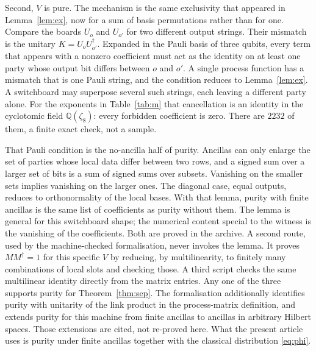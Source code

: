 \documentclass[11pt]{article}
\theoremstyle{definition}
\theoremstyle{remark}
\begin{document}
Second, \(V\) is pure. The mechanism is the same exclusivity that appeared in Lemma~\ref{lem:ex}, now for a sum of basis permutations rather than for one. Compare the boards \(U_o\) and \(U_{o'}\) for two different output strings. Their mismatch is the unitary \(K=U_o U_{o'}^{\dagger}\). Expanded in the Pauli basis of three qubits, every term that appears with a nonzero coefficient must act as the identity on at least one party whose output bit differs between \(o\) and \(o'\). A single process function has a mismatch that is one Pauli string, and the condition reduces to Lemma~\ref{lem:ex}. A switchboard may superpose several such strings, each leaving a different party alone. For the exponents in Table~\ref{tab:m} that cancellation is an identity in the cyclotomic field \(\mathbb{Q}(\zeta_8)\): every forbidden coefficient is zero. There are \(2232\) of them, a finite exact check, not a sample.

That Pauli condition is the no-ancilla half of purity. Ancillas can only enlarge the set of parties whose local data differ between two rows, and a signed sum over a larger set of bits is a sum of signed sums over subsets. Vanishing on the smaller sets implies vanishing on the larger ones. The diagonal case, equal outputs, reduces to orthonormality of the local bases. With that lemma, purity with finite ancillas is the same list of coefficients as purity without them. The lemma is general for this switchboard shape; the numerical content special to the witness is the vanishing of the coefficients. Both are proved in the archive. A second route, used by the machine-checked formalisation, never invokes the lemma. It proves \(MM^{\dagger}=1\) for this specific \(V\) by reducing, by multilinearity, to finitely many combinations of local slots and checking those. A third script checks the same multilinear identity directly from the matrix entries. Any one of the three supports purity for Theorem~\ref{thm:sep}. The formalisation additionally identifies purity with unitarity of the link product in the process-matrix definition, and extends purity for this machine from finite ancillas to ancillas in arbitrary Hilbert spaces. Those extensions are cited, not re-proved here. What the present article uses is purity under finite ancillas together with the classical distribution \eqref{eq:phi}.
\end{document}

